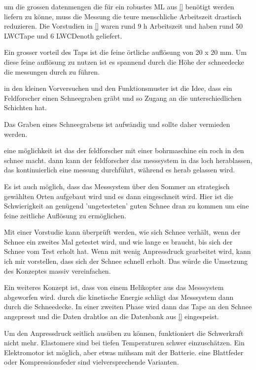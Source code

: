 um die grossen datenmengen die für ein robustes ML aus \ref{} benötigt werden liefern zu könne, muss die Messung die teure menschliche Arbeitszeit drastisch reduzieren. Die Vorstudien in \ref{} waren rund 9 h Arbeitszeit und haben rund 50 LWCTape und 6 LWCDenoth geliefert.


Ein grosser vorteil des Taps ist die feine örtliche auflösung von 20 x 20 mm. Um diese feine auflösung zu nutzen ist es spannend durch die Höhe der schneedecke die messungen durch zu führen.

in den kleinen Vorversuchen und den Funktionsmuster ist die Idee, dass ein Feldforscher einen Schneegraben gräbt und so Zugang an die unterschiedlichen Schichten hat.

Das Graben eines Schneegrabens ist aufwändig und sollte daher vermieden werden.

eine möglichkeit ist das der feldforscher mit einer bohrmaschine ein roch in den schnee macht. dann kann der feldforscher das messsystem in das loch herablassen, das kontinuierlich eine messung durchführt, während es herab gelassen wird.

Es ist auch möglich, dass das Messsystem über den Sommer an strategisch gewählten Orten aufgebaut wird und es dann eingeschneit wird. Hier ist die Schwierigkeit an genügend 'ungetesteten' guten Schnee dran zu kommen um eine feine zeitliche Auflösung zu ermöglichen.

Mit einer Vorstudie kann überprüft werden, wie sich Schnee verhält, wenn der Schnee ein zweites Mal getestet wird, und wie lange es braucht, bis sich der Schnee vom Test erholt hat. Wenn mit wenig Anpressdruck gearbeitet wird, kann ich mir vorstellen, dass sich der Schnee schnell erholt. Das würde die Umsetzung des Konzeptes massiv vereinfachen.

Ein weiteres Konzept ist, dass von einem Helikopter aus das Messsystem abgeworfen wird. durch die kinetische Energie schlägt das Messsystem dann durch die Schneedecke. In einer zweiten Phase wird dann das Tape an den Schnee angepresst und die Daten drahtlos an die Datenbank aus \ref{} eingespeist.

Um den Anpressdruck seitlich ausüben zu können, funktioniert die Schwerkraft nicht mehr. Elastomere sind bei tiefen Temperaturen schwer einzuschätzen. Ein Elektromotor ist möglich, aber etwas mühsam mit der Batterie. eine Blattfeder oder Kompressionsfeder sind vielversprechende Varianten.



